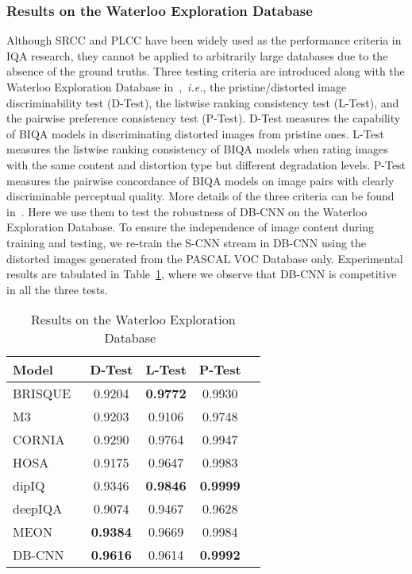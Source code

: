 \documentclass[journal]{IEEEtran}
\begin{document}
\subsubsection{Results on the Waterloo Exploration Database~\cite{ma2017waterloo}}\label{subsec:waterlooeval}
Although SRCC and PLCC have been widely used as the performance criteria in IQA research, they cannot be applied to arbitrarily large databases due to the absence of the ground truths. Three testing criteria are introduced along with the Waterloo Exploration Database in~\cite{ma2017waterloo},~\textit{i.e.}, the pristine/distorted image discriminability test (D-Test), the listwise ranking consistency test (L-Test), and the pairwise preference consistency test (P-Test). D-Test measures the capability of BIQA models in discriminating distorted images from pristine ones. L-Test measures the listwise ranking consistency of BIQA models when rating images with the same content and distortion type but different degradation levels. P-Test measures the pairwise concordance of BIQA models on image pairs with clearly discriminable perceptual quality. More details of the three criteria can be found in~\cite{ma2017waterloo}. Here we use them to test the robustness of DB-CNN on the Waterloo Exploration Database. To ensure the independence of image content during training and testing, we re-train the S-CNN stream in DB-CNN using the distorted images generated from the PASCAL VOC Database only. Experimental results are tabulated in Table~\ref{tab:waterloo}, where we observe that DB-CNN is competitive in all the three tests.

\begin{table}[t]
  \centering
  \caption{Results on the Waterloo Exploration Database~\cite{ma2017waterloo}}\label{tab:waterloo}
  \begin{tabular}{l|cccc}
      \toprule
Model & D-Test & L-Test & P-Test \\
     \hline
BRISQUE~\cite{mittal2012no} & 0.9204 & {\bf 0.9772} & 0.9930 \\
            M3~\cite{xue2014blind} & 0.9203 & 0.9106 & 0.9748 \\
      CORNIA~\cite{ye2012unsupervised}& 0.9290 & 0.9764 & 0.9947 \\
      HOSA~\cite{xu2016blind} & 0.9175 & 0.9647 & 0.9983 \\
dipIQ~\cite{ma2017dipiq} & 0.9346 & {\bf 0.9846} & {\bf 0.9999} \\
            deepIQA~\cite{bosse2016deep} & 0.9074 & 0.9467 & 0.9628 \\

            MEON~\cite{Ma2018End} & {\bf 0.9384} & 0.9669 & 0.9984 \\
     \hline
            DB-CNN & {\bf 0.9616} & 0.9614 & {\bf 0.9992} \\
     \bottomrule
   \end{tabular}
\end{table}
\end{document}
